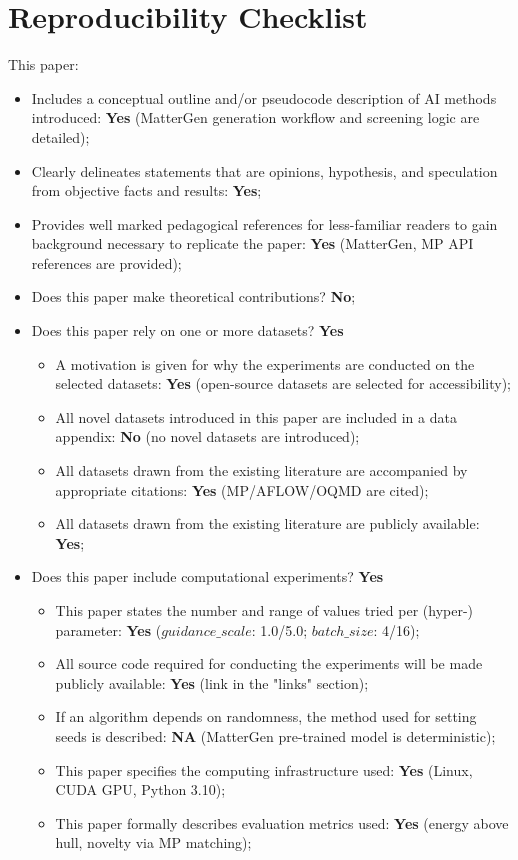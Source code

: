 \documentclass[letterpaper]{article} %
\begin{document}
\section*{Reproducibility Checklist}
This paper:
\begin{itemize}
    \item Includes a conceptual outline and/or pseudocode description of AI methods introduced: \textbf{Yes} (MatterGen generation workflow and screening logic are detailed);
    \item Clearly delineates statements that are opinions, hypothesis, and speculation from objective facts and results: \textbf{Yes};
    \item Provides well marked pedagogical references for less-familiar readers to gain background necessary to replicate the paper: \textbf{Yes} (MatterGen, MP API references are provided);
    \item Does this paper make theoretical contributions? \textbf{No};
    \item Does this paper rely on one or more datasets? \textbf{Yes}
    \begin{itemize}
        \item A motivation is given for why the experiments are conducted on the selected datasets: \textbf{Yes} (open-source datasets are selected for accessibility);
        \item All novel datasets introduced in this paper are included in a data appendix: \textbf{No} (no novel datasets are introduced);
        \item All datasets drawn from the existing literature are accompanied by appropriate citations: \textbf{Yes} (MP/AFLOW/OQMD are cited);
        \item All datasets drawn from the existing literature are publicly available: \textbf{Yes};
    \end{itemize}
    \item Does this paper include computational experiments? \textbf{Yes}
    \begin{itemize}
       \item This paper states the number and range of values tried per (hyper-) parameter: \textbf{Yes} ($guidance\_scale$: 1.0/5.0; $batch\_size$: 4/16);
        \item All source code required for conducting the experiments will be made publicly available: \textbf{Yes} (link in the "links" section);
        \item If an algorithm depends on randomness, the method used for setting seeds is described: \textbf{NA} (MatterGen pre-trained model is deterministic);
        \item This paper specifies the computing infrastructure used: \textbf{Yes} (Linux, CUDA GPU, Python 3.10);
        \item This paper formally describes evaluation metrics used: \textbf{Yes} (energy above hull, novelty via MP matching);
    \end{itemize}
\end{itemize}
\end{document}
